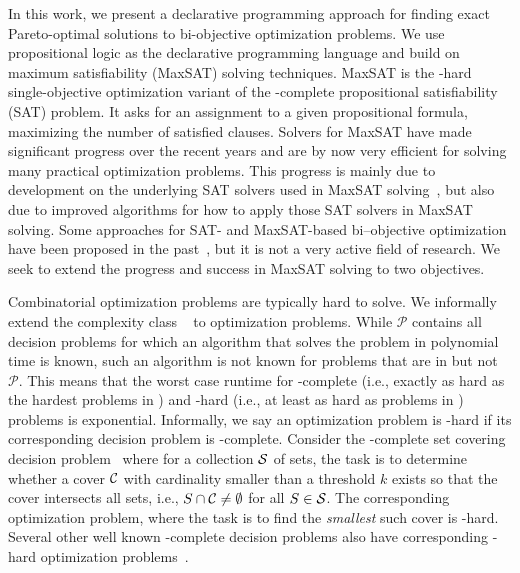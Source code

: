 In this work, we present a declarative programming approach for finding exact Pareto-optimal solutions to bi-objective optimization problems.
We use propositional logic as the declarative programming language and build on maximum satisfiability (MaxSAT) solving techniques.
MaxSAT is the \NP-hard single-objective optimization variant of the \NP-complete propositional satisfiability (SAT) problem.
It asks for an assignment to a given propositional formula, maximizing the number of satisfied clauses.
Solvers for MaxSAT have made significant progress over the recent years and are by now very efficient for solving many practical optimization problems.
This progress is mainly due to development on the underlying SAT solvers used in MaxSAT solving~\autocites{DBLP:journals/ai/FroleyksHIJS21,handbook2-cdcl}, but also due to improved algorithms for how to apply those SAT solvers in MaxSAT solving.
Some approaches for SAT- and MaxSAT-based bi--objective optimization have been proposed in the past~\autocites{DBLP:conf/cp/SohBTB17,DBLP:conf/ijcai/Terra-NevesLM18a,DBLP:conf/aaai/Terra-NevesLM18,DBLP:conf/ijcai/Terra-NevesLM18,DBLP:conf/cp/JanotaMSM21}, but it is not a very active field of research.
We seek to extend the progress and success in MaxSAT solving to two objectives.

Combinatorial optimization problems are typically hard to solve.
We informally extend the complexity class \NP{}~\autocite{AroraBarak2009-complexity} to optimization problems.
While $\mathcal{P}$ contains all decision problems for which an algorithm that solves the problem in polynomial time is known, such an algorithm is not known for problems that are in \NP{} but not $\mathcal{P}$.
This means that the worst case runtime for \NP-complete (i.e., exactly as hard as the hardest problems in \NP) and \NP-hard (i.e., at least as hard as problems in \NP) problems is exponential.
Informally, we say an optimization problem is \NP-hard if its corresponding decision problem is \NP-complete.
Consider the \NP-complete set covering decision problem~\autocite{DBLP:conf/coco/Karp72} where for a collection $\mathcal{S}$ of sets, the task is to determine whether a cover $\mathcal{C}$ with cardinality smaller than a threshold $k$ exists so that the cover intersects all sets, i.e., $S \cap \mathcal{C} \neq \emptyset$ for all $S\in\mathcal{S}$.
The corresponding optimization problem, where the task is to find the \emph{smallest} such cover is \NP-hard.
Several other well known \NP-complete decision problems also have corresponding \NP-hard optimization problems~\autocite{KorteVygen2018-15}.

